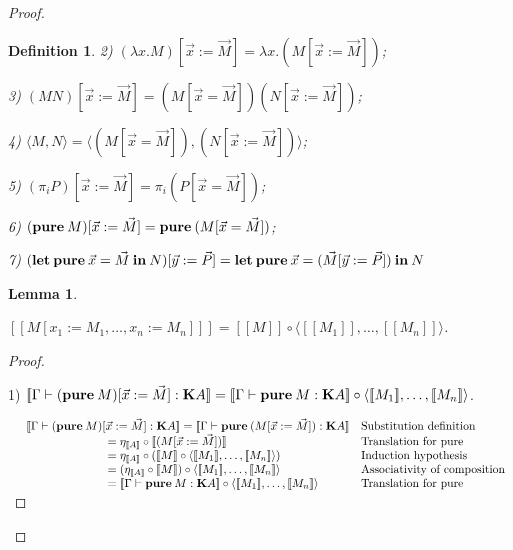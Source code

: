 \documentclass[a4paper]{article}
\newtheorem{lemma}{Lemma}
\newtheorem{defin}{Definition}
\begin{document}
\begin{proof}
\begin{defin}
2) $(\lambda x. M) [ \vec{x} := \vec{M}] = \lambda x. (M [ \vec{x} := \vec{M}])$;

3) $(M N) [ \vec{x} := \vec{M}] = (M [ \vec{x} = \vec{M}]) (N [ \vec{x} := \vec{M}])$;

4) $\langle M, N \rangle = \langle (M [ \vec{x} = \vec{M}]), (N [ \vec{x} := \vec{M}])\rangle$;

5) $(\pi_i P) [ \vec{x} := \vec{M}] = \pi_i (P [ \vec{x} = \vec{M}])$;

6) $({\bf pure \:} M) [ \vec{x} := \vec{M}] = {\bf pure \:} (M [ \vec{x} = \vec{M}])$;

7) $({\bf let \: pure} \: \vec{x} = \vec{M} {\: \bf in \:} N) [\vec{y} := \vec{P}] =
{\bf let \: pure} \: \vec{x} = (\vec{M} [\vec{y} := \vec{P}]) {\: \bf in \:} N$

\end{defin}

\begin{lemma}
$ $

$[\![M [x_1 := M_1,\dots, x_n := M_n]]\!] = [\![M]\!] \circ \langle [\![M_1]\!], \dots, [\![M_n]\!] \rangle$.

\end{lemma}

\begin{proof}

$ $

1) $[\![\Gamma \vdash ({\bf pure \:} M) [ \vec{x} := \vec{M}] : {\bf K}A ]\!] = [\![ \Gamma \vdash {\bf pure \:} M : {\bf K}A]\!] \circ \langle [\![M_1]\!], \dots,
[\![M_n]\!] \rangle$.

\vspace{\baselineskip}

$\begin{array}{lll}
& [\![\Gamma \vdash ({\bf pure \:} M) [ \vec{x} := \vec{M}] : {\bf K}A]\!] = [\![ \Gamma \vdash {\bf pure \:} (M [ \vec{x} := \vec{M}]) : {\bf K}A]\!] &
\text{Substitution definition} \\
& \quad\quad\quad\quad\quad\quad\quad = \eta_{[\![A]\!]} \circ [\![(M [ \vec{x} := \vec{M}])]\!]&
\text{Translation for pure}\\
& \quad\quad\quad\quad\quad\quad\quad = \eta_{[\![A]\!]} \circ ([\![M]\!] \circ \langle [\![M_1]\!], \dots,
[\![M_n]\!] \rangle) & \text{Induction hypothesis} \\
& \quad\quad\quad\quad\quad\quad\quad = (\eta_{[\![A]\!]} \circ [\![M]\!]) \circ \langle [\![M_1]\!], \dots,
[\![M_n]\!] \rangle & \text{Associativity of composition}\\
& \quad\quad\quad\quad\quad\quad\quad = [\![ \Gamma \vdash {\bf pure \:} M : {\bf K}A]\!] \circ \langle [\![M_1]\!], \dots,
[\![M_n]\!] \rangle& \text{Translation for pure}\\
\end{array}$


\end{proof}
\end{proof}
\end{document}

